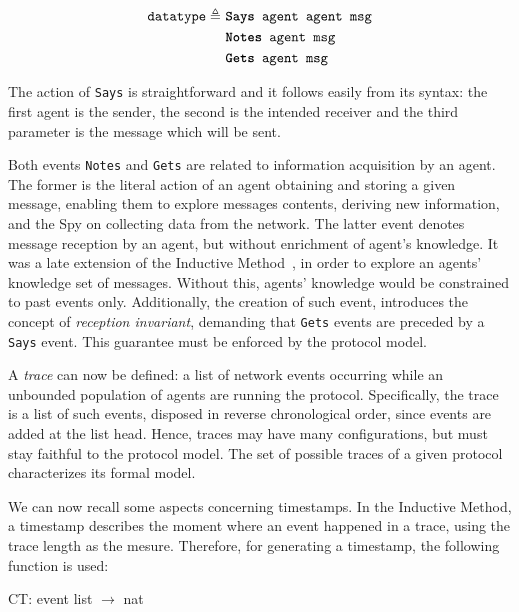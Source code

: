 \begin{equation*}
  \begin{split}
    \texttt{datatype} \triangleq\
    & \texttt{\textbf{Says} agent agent msg} \\
    & \texttt{\textbf{Notes} agent msg} \\
    & \texttt{\textbf{Gets} agent msg}
  \end{split}
\end{equation*}

The action of \texttt{Says} is straightforward and it follows easily from its syntax: the first agent is the sender, the second is the intended receiver and the third parameter is the message which will be sent.

Both events \texttt{Notes} and \texttt{Gets} are related to information acquisition by an agent. The former is the literal action of an agent obtaining and storing a given message, enabling them to explore messages contents, deriving new information, and the Spy on collecting data from the network. The latter event denotes message reception by an agent, but without enrichment of agent's knowledge. It was a late extension of the Inductive Method~\cite[Ch. 8]{Bella2007}, in order to explore an agents' knowledge set of messages. Without this, agents' knowledge would be constrained to past events only. Additionally, the creation of such event, introduces the concept of \textit{reception invariant}, demanding that \texttt{Gets} events are preceded by a \texttt{Says} event. This guarantee must be enforced by the protocol model.

A \textit{trace} can now be defined: a list of network events occurring while an unbounded population of agents are running the protocol. Specifically, the trace is a list of such events, disposed in reverse chronological order, since events are added at the list head. Hence, traces may have many configurations, but must stay faithful to the protocol model. The set of possible traces of a given protocol characterizes its formal model.

We can now recall some aspects concerning timestamps. In the Inductive Method, a timestamp describes the moment where an event happened in a trace, using the trace length as the mesure. Therefore, for generating a timestamp, the following function is used:

\begin{center}
  {\ttfamily CT\@: event list \(\longrightarrow \) nat}
\end{center}

